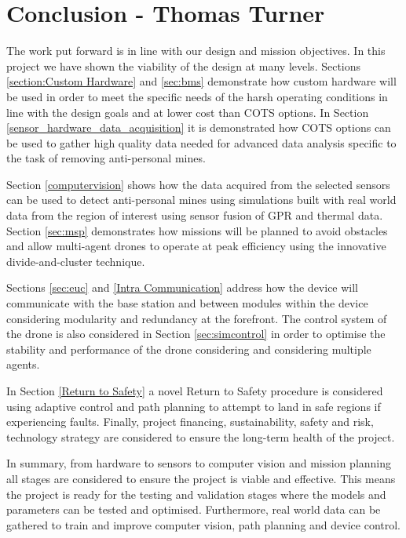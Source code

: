 \newpage
{}

\section{Conclusion - Thomas Turner} \label{conclusion}

The work put forward is in line with our design and mission objectives. In this project we have shown the viability of the design at many levels. Sections \ref{section:Custom Hardware} and \ref{sec:bms} demonstrate how custom hardware will be used in order to meet the specific needs of the harsh operating conditions in line with the design goals and at lower cost than \gls{COTS} options. In Section \ref{sensor_hardware_data_acquisition} it is demonstrated how \gls{COTS} options can be used to gather high quality data needed for advanced data analysis specific to the task of removing anti-personal mines.

Section \ref{computervision} shows how the data acquired from the selected sensors can be used to detect anti-personal mines using simulations built with real world data from the region of interest using sensor fusion of \gls{GPR} and thermal data. Section \ref{sec:msp} demonstrates how missions will be planned to avoid obstacles and allow multi-agent drones to operate at peak efficiency using the innovative divide-and-cluster technique. 

Sections \ref{sec:euc} and \ref{Intra Communication} address how the device will communicate with the base station and between modules within the device considering modularity and redundancy at the forefront. The control system of the drone is also considered in Section \ref{sec:simcontrol} in order to optimise the stability and performance of the drone considering and considering multiple agents. 

In Section \ref{Return to Safety} a novel Return to Safety procedure is considered using adaptive control and path planning to attempt to land in safe regions if experiencing faults. Finally, project financing, sustainability, safety and risk, technology strategy are considered to ensure the long-term health of the project. 

In summary, from hardware to sensors to computer vision and mission planning all stages are considered to ensure the project is viable and effective. This means the project is ready for the testing and validation stages where the models and parameters can be tested and optimised. Furthermore, real world data can be gathered to train and improve computer vision, path planning and device control.